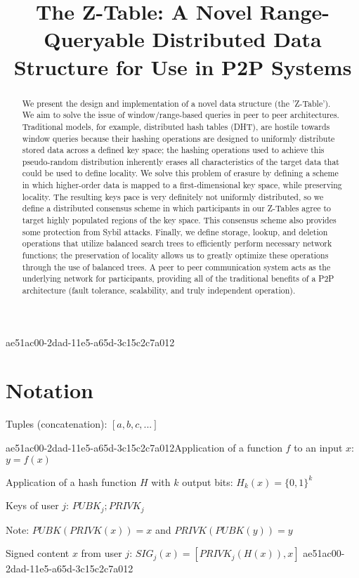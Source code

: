 \documentclass[12pt]{article}
\title{The Z-Table: A Novel Range-Queryable Distributed Data Structure for Use in P2P Systems}
\begin{document}
\maketitle

ae51ac00-2dad-11e5-a65d-3c15c2c7a012\begin{abstract}
We present the design and implementation of a novel data structure (the 'Z-Table'). We aim to solve the issue of window/range-based queries in peer to peer architectures. Traditional models, for example,  distributed hash tables (DHT), are hostile towards window queries because their hashing operations are designed to uniformly distribute stored data across a defined key space; the hashing operations used to achieve this pseudo-random distribution inherently erases all characteristics of the target data that could be used to define locality. We solve this problem of erasure by defining a scheme in which higher-order data is mapped to a first-dimensional key space, while preserving locality. The resulting keys pace is very definitely not uniformly distributed, so we define a distributed consensus scheme in which participants in our Z-Tables agree to target highly populated regions of the key space. This consensus scheme also provides some protection from Sybil attacks. Finally, we define storage, lookup, and deletion operations that utilize balanced search trees to efficiently perform necessary network functions; the preservation of locality allows us to greatly optimize these operations through the use of balanced trees. A peer to peer communication system acts as the underlying network for participants, providing all of the traditional benefits of a P2P architecture (fault tolerance, scalability, and truly independent operation).
\end{abstract}

\section{Notation}

Tuples (concatenation): $[a,b,c,...]$

ae51ac00-2dad-11e5-a65d-3c15c2c7a012Application of a function $f$ to an input $x$: $y=f(x)$

Application of a hash function $H$ with $k$ output bits: $H_{k}(x) = \{0,1\}^k$

Keys of user $j$: $ PUBK_j; PRIVK_j $

Note: $PUBK(PRIVK(x)) = x$ and $PRIVK(PUBK(y)) = y$~

Signed content $x$ from user $j$: $SIG_j(x) = \left[ PRIVK_j( H(x) ), x \right]$
ae51ac00-2dad-11e5-a65d-3c15c2c7a012
\end{document}
